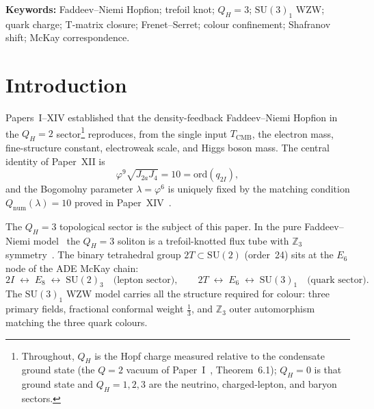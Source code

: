 \documentclass[11pt,a4paper]{article}
\theoremstyle{definition}\newtheorem{definition}[theorem]{Definition}
\theoremstyle{remark}
\newcommand{\vp}{\varphi}
\newcommand{\lam}{\lambda}
\newcommand{\Ja}{J_{2a}}
\newcommand{\Jfour}{J_4}
\newcommand{\TCMB}{T_{\mathrm{CMB}}}
\newcommand{\SU}{\mathrm{SU}}
\newcommand{\twoI}{2I}
\newcommand{\twoT}{2T}
\newcommand{\QH}{Q_H}
\begin{document}
\noindent\textbf{Keywords:}
Faddeev--Niemi Hopfion; trefoil knot; $\QH=3$; $\SU(3)_1$ WZW;
quark charge; T-matrix closure; Frenet--Serret; colour confinement;
Shafranov shift; McKay correspondence.

\tableofcontents\bigskip

\section{Introduction}
\label{P15:sec:intro}

Papers~I--XIV established that the density-feedback
Faddeev--Niemi Hopfion in the $\QH=2$ sector\footnote{Throughout, $\QH$
is the Hopf charge measured relative to the condensate ground state (the
$Q=2$ vacuum of Paper~I~\cite{Paper1}, Theorem~6.1);%
$\QH=0$ is that ground state and $\QH=1,2,3$ are the neutrino,
charged-lepton, and baryon sectors.} reproduces, from
the single input $\TCMB$, the electron mass, fine-structure
constant, electroweak scale, and Higgs boson mass.
The central identity of Paper~XII is
\begin{equation}
  \vp^9\sqrt{\Ja\Jfour} = 10 = \mathrm{ord}(q_{\twoI}),
  \label{P15:eq:norm2}
\end{equation}
and the Bogomolny parameter $\lam=\vp^6$ is uniquely fixed by
the matching condition $Q_{\mathrm{num}}(\lam)=10$ proved in
Paper~XIV~\cite{Paper14}.

The $\QH=3$ topological sector is the subject of this paper.
In the pure Faddeev--Niemi model~\cite{Faddeev1997}
the $\QH=3$ soliton is a trefoil-knotted flux tube with
$\mathbb{Z}_3$ symmetry~\cite{Battye1998}.
The binary tetrahedral group $\twoT\subset\SU(2)$ (order~24)
sits at the $E_6$ node of the ADE McKay chain:
\begin{equation}
  \twoI\;\leftrightarrow\;E_8\;\leftrightarrow\;\SU(2)_3
  \quad\text{(lepton sector)},
  \qquad
  \twoT\;\leftrightarrow\;E_6\;\leftrightarrow\;\SU(3)_1
  \quad\text{(quark sector)}.
  \label{P15:eq:mckay}
\end{equation}
The $\SU(3)_1$ WZW model carries all the structure required for colour:
three primary fields, fractional conformal weight $\tfrac{1}{3}$,
and $\mathbb{Z}_3$ outer automorphism matching the three quark colours.
\end{document}

